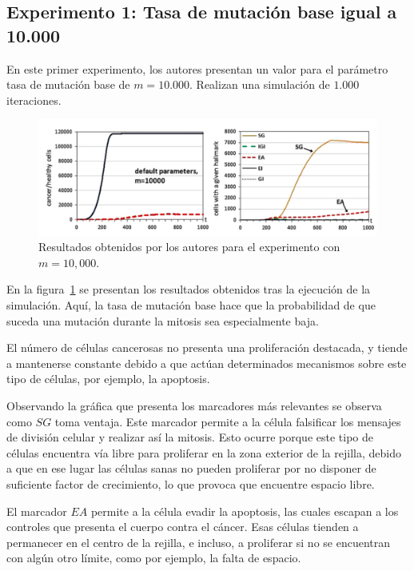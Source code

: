 \subsection{Experimento 1: Tasa de mutación base igual a 10.000}

En este primer experimento, los autores presentan un valor para el parámetro
tasa de mutación base de $m=10.000$. Realizan una simulación de $1.000$ iteraciones.

\begin{figure}[h]
\centering
\includegraphics[scale=0.6]{figures/experiments/exp1}
\caption{Resultados obtenidos por los autores para el experimento con $m=10,000$.}
\label{fig:exp1}
\end{figure}

En la figura~\ref{fig:exp1} se presentan los resultados obtenidos tras la ejecución de la
simulación. Aquí, la tasa de mutación base hace que la probabilidad de que suceda una
mutación durante la mitosis sea especialmente baja.

El número de células cancerosas no presenta una proliferación destacada, y tiende a
mantenerse constante debido a que actúan determinados mecanismos sobre este tipo de células,
por ejemplo, la apoptosis.

Observando la gráfica que presenta los marcadores más relevantes se observa como
$SG$ toma ventaja. Este marcador permite a la célula falsificar los mensajes de
división celular y realizar así la mitosis. Esto ocurre porque este tipo de células
encuentra vía libre para proliferar en la zona exterior de la rejilla, debido a que
en ese lugar las células sanas no pueden proliferar por no disponer de suficiente
factor de crecimiento, lo que provoca que encuentre espacio libre.

El marcador $EA$ permite a la célula evadir la apoptosis, las cuales escapan
a los controles que presenta el cuerpo contra el cáncer. Esas células tienden a
permanecer en el centro de la rejilla, e incluso, a proliferar si no se encuentran con
algún otro límite, como por ejemplo, la falta de espacio.

